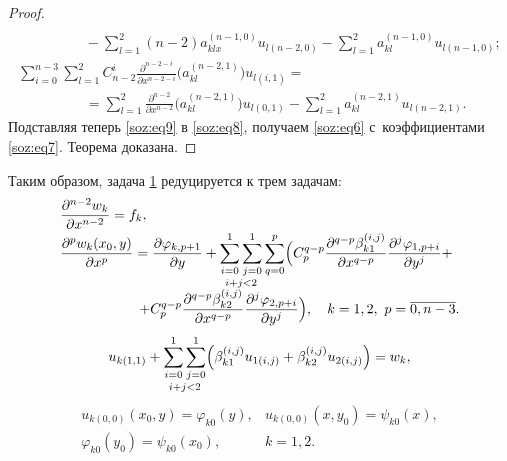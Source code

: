 \begin{proof}
\begin{gather}
\\
\hspace{2cm}
-\sum\limits_{l=1}^{2}(n-2)a_{klx}^{(n-1,0)}u_{l(n-2,0)}-
\sum\limits_{l=1}^{2}a_{kl}^{(n-1,0)}u_{l(n-1,0)};
\\
\sum\limits_{i=0}^{n-3}\sum\limits_{l=1}^{2}C_{n-2}^{i}\frac{\partial^{n-2-i}}{\partial x^{n-2-i}}\bigl(a_{kl}^{(n-2,1)}\bigr)u_{l(i,1)}=
\hspace{2cm}
\\
\hspace{2cm}
=\sum\limits_{l=1}^{2}\frac{\partial^{n-2}}{\partial x^{n-2}}\bigl(a_{kl}^{(n-2,1)}\bigr)u_{l(0,1)}-\sum\limits_{l=1}^{2}a_{kl}^{(n-2,1)}u_{l(n-2,1)}.
\end{gather}
Подставляя теперь \eqref{soz:eq9}  в \eqref{soz:eq8}, получаем \eqref{soz:eq6} с~коэффициентами \eqref{soz:eq7}. Теорема доказана.
\end{proof}

Таким образом, задача \hyperlink{soz:task1}{1} редуцируется к трем задачам:
\begin{equation}
\label{soz:eq10}
\begin{array}{l}
\displaystyle
\frac{\partial^{n-2} w_{k}}{\partial x^{n-2}}=f_{k},\\[2mm] 
\displaystyle
\frac{\partial^{p} w_{k}(x_{0},y)}{\partial x^{p}}=\frac{\partial\varphi_{k,p+1}}{\partial y}+
\mathop{\sum\limits_{i=0}^{1}\sum\limits_{j=0}^{1}}\limits_{i + j < 2} \sum\limits_{q=0}^{p} \Bigl(C_{p}^{q-p}\frac{\partial^{q-p}\beta_{k1}^{(i,j)}}{\partial x^{q-p}}\frac{\partial^{j}\varphi_{1,p+i}}{\partial y^{j}}+
\\
\displaystyle \hspace{2cm}
+
C_{p}^{q-p}\frac{\partial^{q-p}\beta_{k2}^{(i,j)}}{\partial x^{q-p}}\frac{\partial^{j}\varphi_{2,p+i}}{\partial y^{j}}\Bigr), \quad  k=1, 2,\ p=\overline{0,n-3}.
\end{array}
\end{equation}
\begin{equation}
\label{soz:eq11}
u_{k(1,1)}+\mathop{\sum\limits_{i=0}^{1}\sum\limits_{j=0}^{1}}\limits_{i + j < 2} \Bigl(\beta_{k1}^{(i,j)}u_{1(i,j)}+\beta_{k2}^{(i,j)}u_{2(i,j)}\Bigr)=w_{k},
\end{equation}
\begin{equation}
\label{soz:eq12}
\begin{array}{rl}
u_{k(0,0)}(x_{0}, y)=\varphi_{k0}(y),& u_{k(0,0)}(x,y_{0})=\psi_{k0}(x),
\\
 \varphi_{k0}(y_{0})=\psi_{k0}(x_{0}),& k=1, 2.
 \end{array}
\end{equation}

